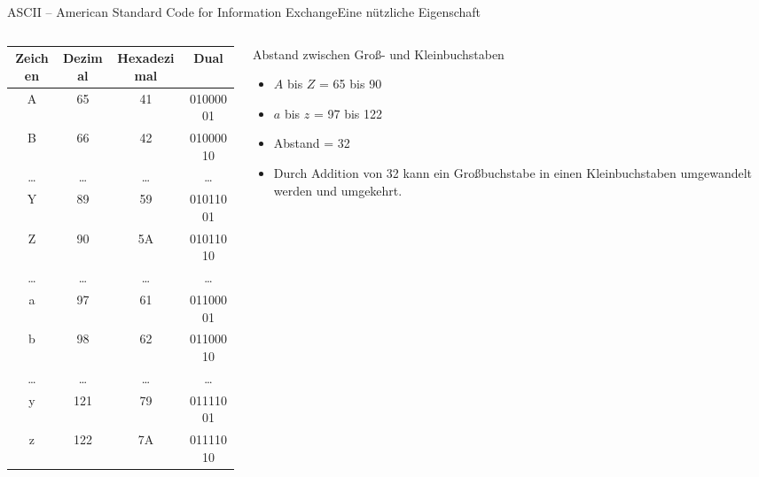 \documentclass[xelatex,aspectratio=169]{beamer}
\begin{document}
\begin{frame}[allowframebreaks]{ASCII -- American Standard Code for Information Exchange}{Eine nützliche Eigenschaft}
    \begin{columns}
        \begin{column}{0.5\textwidth}
            \begin{tabular}{cccc}
                \toprule
                Zeichen & Dezimal & Hexadezimal & Dual     \\
                \midrule
                A       & 65      & 41          & 01000001 \\
                B       & 66      & 42          & 01000010 \\
                \ldots  & \ldots  & \ldots      & \ldots   \\
                Y       & 89      & 59          & 01011001 \\
                Z       & 90      & 5A          & 01011010 \\
                \ldots  & \ldots  & \ldots      & \ldots   \\
                a       & 97      & 61          & 01100001 \\
                b       & 98      & 62          & 01100010 \\
                \ldots  & \ldots  & \ldots      & \ldots   \\
                y       & 121     & 79          & 01111001 \\
                z       & 122     & 7A          & 01111010 \\
                \bottomrule
            \end{tabular}
        \end{column}
        \begin{column}{0.5\textwidth}
            \begin{block}{Abstand zwischen Groß- und Kleinbuchstaben}
                \begin{itemize}
                    \item $A$ bis $Z$ = 65 bis 90
                    \item $a$ bis $z$ = 97 bis 122
                    \item Abstand = 32
                    \item Durch Addition von 32 kann ein Großbuchstabe in einen Kleinbuchstaben umgewandelt werden und umgekehrt.
                \end{itemize}
            \end{block}
        \end{column}
    \end{columns}
\end{frame}
\end{document}
